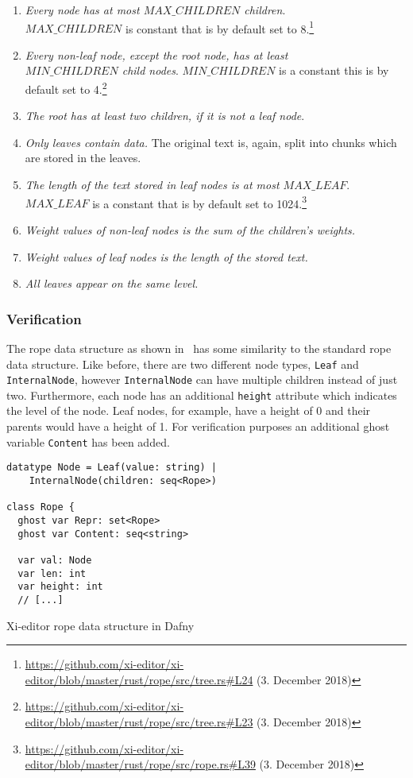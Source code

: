 \begin{enumerate}
  \item \textit{Every node has at most $MAX\_CHILDREN$ children}. \\ $MAX\_CHILDREN$ is constant that is by default set to 8.\footnote{\url{https://github.com/xi-editor/xi-editor/blob/master/rust/rope/src/tree.rs\#L24} (3. December 2018)}
  \item \textit{Every non-leaf node, except the root node, has at least \\ $MIN\_CHILDREN$ child nodes}. $MIN\_CHILDREN$ is a constant this is by default set to 4.\footnote{\url{https://github.com/xi-editor/xi-editor/blob/master/rust/rope/src/tree.rs\#L23} (3. December 2018)}
  \item \textit{The root has at least two children, if it is not a leaf node}.
  \item \textit{Only leaves contain data.} The original text is, again, split into chunks which are stored in the leaves.
  \item \textit{The length of the text stored in leaf nodes is at most $MAX\_LEAF$}. $MAX\_LEAF$ is a constant that is by default set to 1024.\footnote{\url{https://github.com/xi-editor/xi-editor/blob/master/rust/rope/src/rope.rs\#L39} (3. December 2018)}
  \item \textit{Weight values of non-leaf nodes is the sum of the children's weights.}
  \item \textit{Weight values of leaf nodes is the length of the stored text.}
  \item \textit{All leaves appear on the same level.}
\end{enumerate}

\subsubsection{Verification}

The rope data structure as shown in~ has some similarity to the standard rope data structure.
Like before, there are two different node types, \texttt{Leaf} and \texttt{InternalNode}, however \texttt{InternalNode} can have multiple children instead of just two.
Furthermore, each node has an additional \texttt{height} attribute which indicates the level of the node.
Leaf nodes, for example, have a height of 0 and their parents would have a height of 1.
For verification purposes an additional ghost variable \texttt{Content} has been added.

\begin{listing}[h!]
\begin{verbatim}
datatype Node = Leaf(value: string) |
    InternalNode(children: seq<Rope>)

class Rope {
  ghost var Repr: set<Rope>
  ghost var Content: seq<string>

  var val: Node
  var len: int
  var height: int
  // [...]
\end{verbatim}
    \caption{Xi-editor rope data structure in Dafny}
    \label{lst:xi-rope}
\end{listing}

